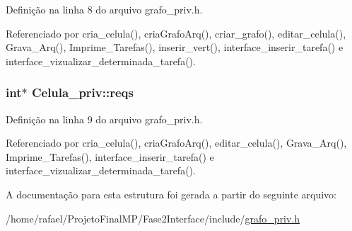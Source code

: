 Definição na linha 8 do arquivo grafo\+\_\+priv.\+h.



Referenciado por cria\+\_\+celula(), cria\+Grafo\+Arq(), criar\+\_\+grafo(), editar\+\_\+celula(), Grava\+\_\+\+Arq(), Imprime\+\_\+\+Tarefas(), inserir\+\_\+vert(), interface\+\_\+inserir\+\_\+tarefa() e interface\+\_\+vizualizar\+\_\+determinada\+\_\+tarefa().

\hypertarget{structCelula__priv_ad54839cd4d96e78a58c226ab2e8d0579}{}
\subsubsection[{reqs}]{\setlength{\rightskip}{0pt plus 5cm}int$\ast$ Celula\+\_\+priv\+::reqs}\label{structCelula__priv_ad54839cd4d96e78a58c226ab2e8d0579}


Definição na linha 9 do arquivo grafo\+\_\+priv.\+h.



Referenciado por cria\+\_\+celula(), cria\+Grafo\+Arq(), editar\+\_\+celula(), Grava\+\_\+\+Arq(), Imprime\+\_\+\+Tarefas(), interface\+\_\+inserir\+\_\+tarefa() e interface\+\_\+vizualizar\+\_\+determinada\+\_\+tarefa().



A documentação para esta estrutura foi gerada a partir do seguinte arquivo\+:\begin{DoxyCompactItemize}
\item 
/home/rafael/\+Projeto\+Final\+M\+P/\+Fase2\+Interface/include/\hyperlink{grafo__priv_8h}{grafo\+\_\+priv.\+h}\end{DoxyCompactItemize}
